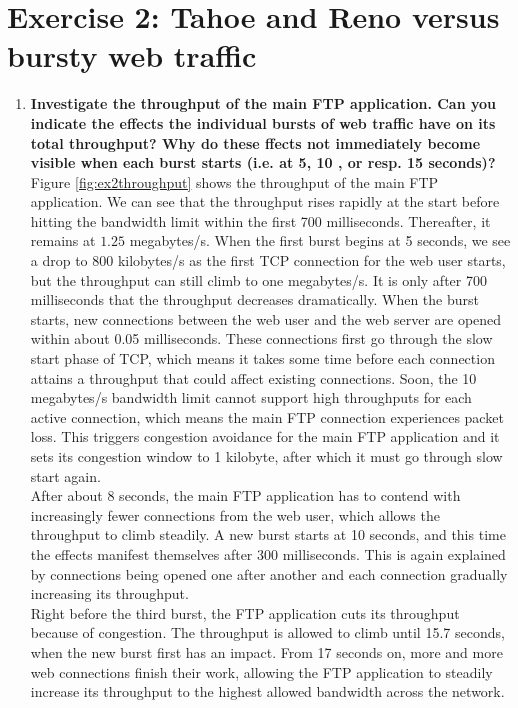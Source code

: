 \section{Exercise 2: Tahoe and Reno versus bursty web traffic}
\begin{enumerate}
 \item \textbf{Investigate the throughput of the main FTP application. Can you indicate the effects the
 individual bursts of web traffic have on its total throughput? Why do these ffects not immediately
 become visible when each burst starts (i.e. at 5, 10 , or resp. 15 seconds)?} \\
 
 Figure \ref{fig:ex2throughput} shows the throughput of the main FTP application. We can see that the throughput rises
 rapidly at the start before hitting the bandwidth limit within the first 700 milliseconds. Thereafter, it remains at $1.25$
 megabytes/s. When the first burst begins at 5 seconds, we see a drop to 800 kilobytes/s as the first TCP connection for the web user
 starts, but the throughput can still climb to one megabytes/s. It is only after 700 milliseconds that the throughput
 decreases dramatically. When the burst starts, new connections between the web user and the web server are opened within
 about 0.05 milliseconds. These connections first go through the slow start phase of TCP, which means it takes some time
 before each connection attains a throughput that could affect existing connections. Soon, the 10 megabytes/s bandwidth
 limit cannot support high throughputs for each active connection, which means the main FTP connection experiences packet loss. This triggers
 congestion avoidance for the main FTP application and it sets its congestion window to 1 kilobyte, after which it
 must go through slow start again. \\
 
 After about 8 seconds, the main FTP application has to contend with increasingly fewer connections from the web user,
 which allows the throughput to climb steadily. A new burst starts at 10 seconds, and this time the effects manifest
 themselves after 300 milliseconds. This is again explained by connections being opened one after another and
 each connection gradually increasing its throughput. \\
 
 Right before the third burst, the FTP application cuts its throughput because of congestion. The throughput is allowed
 to climb until 15.7 seconds, when the new burst first has an impact. From 17 seconds on, more and more web connections
 finish their work, allowing the FTP application to steadily increase its throughput to the highest allowed bandwidth
 across the network.
 

\end{enumerate}

